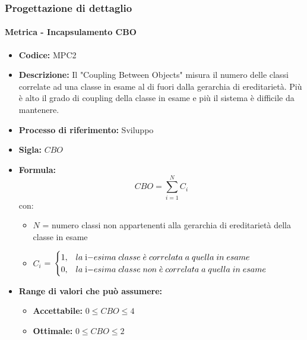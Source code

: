 \subsubsection{Progettazione di dettaglio}
    \paragraph{Metrica - Incapsulamento CBO}
    \begin{itemize}
        \item \textbf{Codice:} MPC2
        \item \textbf{Descrizione:} Il "Coupling Between Objects" misura il numero delle classi correlate ad una classe in esame al di fuori dalla gerarchia di ereditarietà. Più è alto il grado di coupling della classe in esame e più il sistema è difficile da mantenere.
        \item \textbf{Processo di riferimento:} Sviluppo
        \item \textbf{Sigla:} $CBO$
        \item \textbf{Formula:} $$CBO = {\sum_{i=1}^{N} C_i}$$
        con:
        \begin{itemize}
            \item $N$ = numero classi non appartenenti alla gerarchia di ereditarietà della classe in esame
            \item $C_i$ =
            \begin{math} {
                \begin{cases}
                    1, & la \; $i$-esima \; classe \; \grave{e} \; correlata \; a \; quella \; in \; esame \\
                    0, & la \; $i$-esima \; classe \; non \; \grave{e} \; correlata \; a \; quella \; in \; esame
                \end{cases}
            }
            \end{math}
        \end{itemize}
        \item \textbf{Range di valori che può assumere:}
        \begin{itemize}
            \item \textbf{Accettabile:} $0 \leq{} CBO \leq 4$
            \item \textbf{Ottimale:} $0 \leq{} CBO \leq 2$
        \end{itemize}
    \end{itemize}

